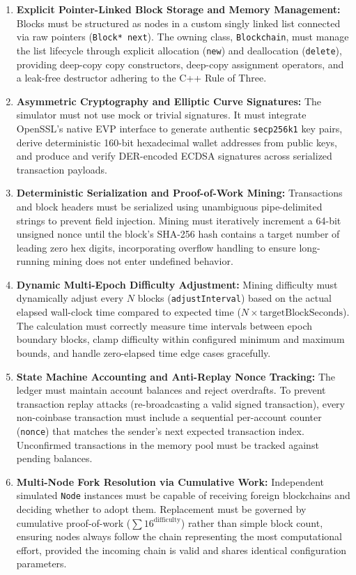 \documentclass[11pt,a4paper]{report}
\begin{document}
\begin{enumerate}
    \item \textbf{Explicit Pointer-Linked Block Storage and Memory Management:} 
    Blocks must be structured as nodes in a custom singly linked list connected via raw pointers (\texttt{Block* next}). The owning class, \texttt{Blockchain}, must manage the list lifecycle through explicit allocation (\texttt{new}) and deallocation (\texttt{delete}), providing deep-copy copy constructors, deep-copy assignment operators, and a leak-free destructor adhering to the C++ Rule of Three.
    
    \item \textbf{Asymmetric Cryptography and Elliptic Curve Signatures:}
    The simulator must not use mock or trivial signatures. It must integrate OpenSSL's native EVP interface to generate authentic \texttt{secp256k1} key pairs, derive deterministic 160-bit hexadecimal wallet addresses from public keys, and produce and verify DER-encoded ECDSA signatures across serialized transaction payloads.
    
    \item \textbf{Deterministic Serialization and Proof-of-Work Mining:}
    Transactions and block headers must be serialized using unambiguous pipe-delimited strings to prevent field injection. Mining must iteratively increment a 64-bit unsigned nonce until the block's SHA-256 hash contains a target number of leading zero hex digits, incorporating overflow handling to ensure long-running mining does not enter undefined behavior.
    
    \item \textbf{Dynamic Multi-Epoch Difficulty Adjustment:}
    Mining difficulty must dynamically adjust every $N$ blocks (\texttt{adjustInterval}) based on the actual elapsed wall-clock time compared to expected time ($N \times \text{targetBlockSeconds}$). The calculation must correctly measure time intervals between epoch boundary blocks, clamp difficulty within configured minimum and maximum bounds, and handle zero-elapsed time edge cases gracefully.
    
    \item \textbf{State Machine Accounting and Anti-Replay Nonce Tracking:}
    The ledger must maintain account balances and reject overdrafts. To prevent transaction replay attacks (re-broadcasting a valid signed transaction), every non-coinbase transaction must include a sequential per-account counter (\texttt{nonce}) that matches the sender's next expected transaction index. Unconfirmed transactions in the memory pool must be tracked against pending balances.
    
    \item \textbf{Multi-Node Fork Resolution via Cumulative Work:}
    Independent simulated \texttt{Node} instances must be capable of receiving foreign blockchains and deciding whether to adopt them. Replacement must be governed by cumulative proof-of-work ($\sum 16^{\text{difficulty}}$) rather than simple block count, ensuring nodes always follow the chain representing the most computational effort, provided the incoming chain is valid and shares identical configuration parameters.
\end{enumerate}
\end{document}
